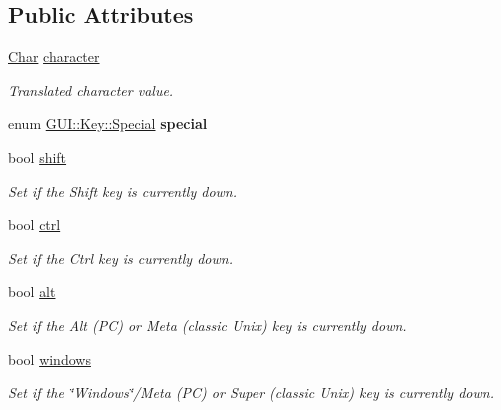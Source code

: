 \subsection*{Public Attributes}
\begin{DoxyCompactItemize}
\item 
\hyperlink{namespaceGUI_af6b04b46d40197b4f00e553d7d1a3e4c}{Char} \hyperlink{classGUI_1_1Key_a08e3432cc2bc3ceded36c3405fca4353}{character}
\begin{DoxyCompactList}\small\item\em Translated character value. \end{DoxyCompactList}\item 
\hypertarget{classGUI_1_1Key_a2f8ffc230acb42ec872ac86ae3751288}{enum \hyperlink{classGUI_1_1Key_a9d3f8dbfc08f0189dbb8aa5a20b9ea99}{G\-U\-I\-::\-Key\-::\-Special} {\bfseries special}}\label{classGUI_1_1Key_a2f8ffc230acb42ec872ac86ae3751288}

\item 
\hypertarget{classGUI_1_1Key_a1d5e7cc9901d4a4de7bb735da176aef1}{bool \hyperlink{classGUI_1_1Key_a1d5e7cc9901d4a4de7bb735da176aef1}{shift}}\label{classGUI_1_1Key_a1d5e7cc9901d4a4de7bb735da176aef1}

\begin{DoxyCompactList}\small\item\em Set if the Shift key is currently down. \end{DoxyCompactList}\item 
\hypertarget{classGUI_1_1Key_a1f76abf9d09f4058ab21fde120958ee3}{bool \hyperlink{classGUI_1_1Key_a1f76abf9d09f4058ab21fde120958ee3}{ctrl}}\label{classGUI_1_1Key_a1f76abf9d09f4058ab21fde120958ee3}

\begin{DoxyCompactList}\small\item\em Set if the Ctrl key is currently down. \end{DoxyCompactList}\item 
\hypertarget{classGUI_1_1Key_a717d049af03dea6f7fafd58dd3160ebe}{bool \hyperlink{classGUI_1_1Key_a717d049af03dea6f7fafd58dd3160ebe}{alt}}\label{classGUI_1_1Key_a717d049af03dea6f7fafd58dd3160ebe}

\begin{DoxyCompactList}\small\item\em Set if the Alt (P\-C) or Meta (classic Unix) key is currently down. \end{DoxyCompactList}\item 
bool \hyperlink{classGUI_1_1Key_abc017c8f165f2b4c857c757ef413da3c}{windows}
\begin{DoxyCompactList}\small\item\em Set if the \char`\"{}\-Windows\char`\"{}/\-Meta (P\-C) or Super (classic Unix) key is currently down. \end{DoxyCompactList}\end{DoxyCompactItemize}


